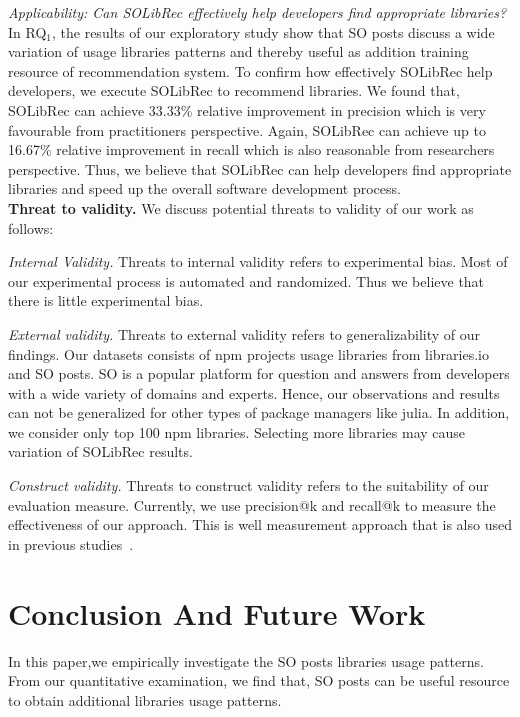 \documentclass[paper]{ieice}
\begin{document}
\noindent\textit{Applicability: Can SOLibRec effectively help developers find appropriate libraries?}\\
In RQ$_1$, the results of our exploratory study show that SO posts discuss a wide variation of usage libraries patterns and thereby useful as addition training resource of recommendation system. To confirm how effectively SOLibRec help developers, we execute SOLibRec to recommend libraries. We found that, SOLibRec can achieve 33.33\% relative improvement in precision which is very favourable from practitioners perspective. Again, SOLibRec can achieve up to 16.67\% relative improvement in recall which is also reasonable from researchers perspective. Thus, we believe that SOLibRec can help developers find appropriate libraries and speed up the overall software development process.\\

\noindent\textbf{Threat to validity.} We discuss potential threats to validity of our work as follows:

\textit{Internal Validity. }  Threats to internal validity refers to experimental bias. Most of our experimental process is automated and randomized. Thus we believe that there is little experimental bias.

\textit{External validity. } Threats to external validity refers to generalizability of our findings. Our datasets consists of npm projects usage libraries from libraries.io and SO posts. SO is a popular platform for question and answers from developers with a wide variety of domains and experts. Hence, our observations and results can not be generalized for other types of package managers like julia. In addition, we consider only top 100 npm libraries. Selecting more libraries may cause variation of SOLibRec results. 

\textit{Construct validity. } Threats to construct validity refers to the suitability of our evaluation measure. Currently, we use precision@k and recall@k to measure the effectiveness of our approach. This is well measurement approach that is also used in previous studies~\cite{thung2013automated, nguyen2020crossrec}.

\section{Conclusion And Future Work}
\label{sec:conclusion}
In this paper,we empirically investigate the SO posts libraries usage patterns. From our quantitative examination, we find that, SO posts can be useful resource to obtain additional libraries usage patterns. 
\end{document}
